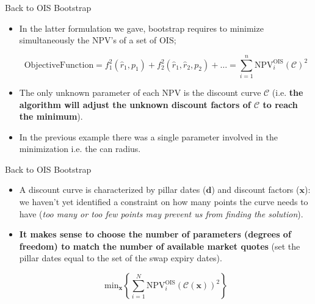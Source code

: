 \documentclass{beamer}
\begin{document}
\begin{frame}{Back to OIS Bootstrap}
\begin{itemize} 
 \item In the latter formulation we gave, bootstrap requires to minimize simultaneously the NPV's of a set of OIS;
 
 \begin{equation}
 \mathrm{Objective Function} =	f_1^2(\hat{r}_1,p_1) + f_2^2(\hat{r}_1, \hat{r}_2,p_2) + \ldots =\sum_{i=1}^{n}\mathrm{NPV}^\mathrm{OIS}_i(\mathcal{C})^2
 \end{equation}
 
 \item  The only unknown parameter of each NPV is the discount curve $\mathcal{C}$ (i.e. \textbf{the algorithm will adjust the unknown discount factors of $\mathcal{C}$ to reach the minimum}).
 \item In the previous example there was a single parameter involved in the minimization i.e. the can radius.
\end{itemize}
\end{frame}

\begin{frame}{Back to OIS Bootstrap}
	\begin{itemize} 
 \item A discount curve is characterized by pillar dates ($\mathbf{d}$) and discount factors ($\mathbf{x}$):
we haven't yet identified a constraint on how many points the curve needs to have (\emph{too many or too few points may prevent us from finding the solution}).
  \item \textbf{It makes sense to choose the number of parameters (degrees of freedom) to match the number of available market quotes} (set the pillar dates equal to the set of the swap expiry dates).
 
 \begin{equation}
  \mathrm{min}_{\mathbf{x}} \left\{\sum_{i=1}^{N}\mathrm{NPV}^\mathrm{OIS}_i( \mathcal{C}(\mathbf{x}))^2\right\}
 \end{equation}
\end{itemize}
\href{https://colab.research.google.com/drive/1ZPjDST00jXLR1MIXapcyPaNkW-GMNciA?authuser=1\#scrollTo=I6WBjiG-iZZu\&line=1\&uniqifier=1}{}
\end{frame} 
     
\end{document}
